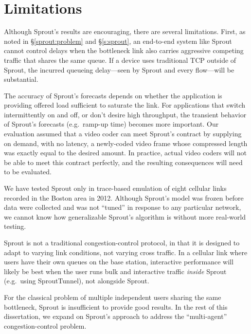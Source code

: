 \section{Limitations}

Although Sprout's results are encouraging, there are several
limitations. First, as noted in \S\ref{sprout:problem} and
\S\ref{s:sprout}, an end-to-end system like Sprout cannot control
delays when the bottleneck link also carries aggressive competing
traffic that shares the same queue. If a device uses traditional TCP
outside of Sprout, the incurred queueing delay---seen by Sprout and
every flow---will be substantial.


The accuracy of Sprout's forecasts depends on whether the application
is providing offered load sufficient to saturate the link. For
applications that switch intermittently on and off, or don't desire
high throughput, the transient behavior of Sprout's forecasts
(e.g.~ramp-up time) becomes more important. Our evaluation assumed
that a video coder can meet Sprout's contract by supplying on demand,
with no latency, a newly-coded video frame whose compressed length was
exactly equal to the desired amount. In practice, actual video coders
will not be able to meet this contract perfectly, and the resulting
consequences will need to be evaluated.

We have tested Sprout only in trace-based emulation of eight cellular
links recorded in the Boston area in 2012. Although Sprout's model was
frozen before data were collected and was not ``tuned'' in response to
any particular network, we cannot know how generalizable Sprout's
algorithm is without more real-world testing.

Sprout is not a traditional congestion-control protocol, in that it is
designed to adapt to varying link conditions, not varying cross
traffic. In a cellular link where users have their own queues on the
base station, interactive performance will likely be best when the
user runs bulk and interactive traffic \emph{inside} Sprout
(e.g.~using SproutTunnel), not alongside Sprout.

For the classical problem of multiple independent users sharing the
same bottleneck, Sprout is insufficient to provide good results. In
the rest of this dissertation, we expand on Sprout's approach to
address the ``multi-agent'' congestion-control problem.

